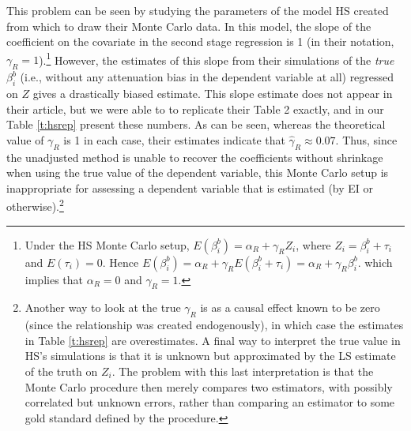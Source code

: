 \documentclass[11pt,titlepage]{article}
\begin{document}
This problem can be seen by studying the parameters of the model HS
created from which to draw their Monte Carlo data.  In this model, the
slope of the coefficient on the covariate in the second stage
regression is 1 (in their notation, $\gamma_R=1$).\footnote{Under the
  HS Monte Carlo setup, $E(\beta_i^b)=\alpha_R+\gamma_R Z_i$, where
  $Z_i=\beta_i^b+\tau_i$ and $E(\tau_i)=0$.  Hence
  $E(\beta_i^b)=\alpha_R+\gamma_RE(\beta_i^b+\tau_i)=\alpha_R+\gamma_R\beta_i^b$.
  which implies that $\alpha_R=0$ and $\gamma_R=1$.}  However, the
estimates of this slope from their simulations of the \emph{true}
$\beta_i^b$ (i.e., without any attenuation bias in the dependent
variable at all) regressed on $Z$ gives a drastically biased estimate.
This slope estimate does not appear in their article, but we were able
to to replicate their Table 2 exactly, and in our Table \ref{t:hsrep}
present these numbers.  As can be seen, whereas the theoretical value
of $\gamma_R$ is 1 in each case, their estimates indicate that
$\hat\gamma_R\approx 0.07$.  Thus, since the unadjusted method is
unable to recover the coefficients without shrinkage when using the
true value of the dependent variable, this Monte Carlo setup is
inappropriate for assessing a dependent variable that is estimated (by
EI or otherwise).\footnote{Another way to look at the true $\gamma_R$
  is as a causal effect known to be zero (since the relationship was
  created endogenously), in which case the estimates in Table
  \ref{t:hsrep} are overestimates.  A final way to interpret the true
  value in HS's simulations is that it is unknown but approximated by
  the LS estimate of the truth on $Z_i$.  The problem with this last
  interpretation is that the Monte Carlo procedure then merely
  compares two estimators, with possibly correlated but unknown
  errors, rather than comparing an estimator to some gold standard
  defined by the procedure.}
\end{document}
